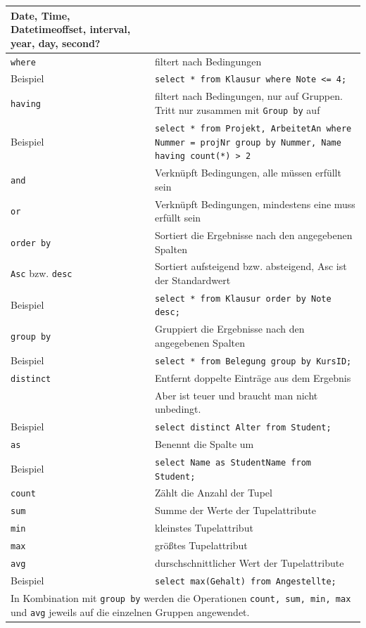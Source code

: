 \documentclass{article}
\begin{document}
\begin{center}
\begin{longtable}{|p{4cm}|p{7cm}|}
    \hline
    Date, Time, Datetimeoffset, interval, year, day, second? & \\
    \hline
    \texttt{where} & filtert nach Bedingungen \\
    \hline
    Beispiel & \texttt{select * from Klausur where Note <= 4;} \\
    \hline
    \texttt{having} & filtert nach Bedingungen, nur auf Gruppen. Tritt nur zusammen mit \texttt{Group by} auf \\
    \hline
    Beispiel & \texttt{select * from Projekt, ArbeitetAn where Nummer = projNr group by Nummer, Name having count(*) > 2} \\
    \hline
    \texttt{and} & Verknüpft Bedingungen, alle müssen erfüllt sein \\
    \hline
    \texttt{or} & Verknüpft Bedingungen, mindestens eine muss erfüllt sein \\
    \hline
    \texttt{order by} & Sortiert die Ergebnisse nach den angegebenen Spalten \\
    \hline
    \texttt{Asc} bzw. \texttt{desc} & Sortiert aufsteigend bzw. absteigend, Asc ist der Standardwert \\
    \hline
    Beispiel & \texttt{select * from Klausur order by Note desc;} \\
    \hline
    \texttt{group by} & Gruppiert die Ergebnisse nach den angegebenen Spalten \\
    \hline
    Beispiel & \texttt{select * from Belegung group by KursID;} \\
    \hline
    \texttt{distinct} & Entfernt doppelte Einträge aus dem Ergebnis \\
    & Aber ist teuer und braucht man nicht unbedingt.\\
    \hline
    Beispiel & \texttt{select distinct Alter from Student;} \\
    \hline
    \texttt{as} & Benennt die Spalte um \\
    Beispiel & \texttt{select Name as StudentName from Student;} \\
    \hline
    \texttt{count} & Zählt die Anzahl der Tupel \\
    \hline
    \texttt{sum} & Summe der Werte der Tupelattribute \\
    \hline
    \texttt{min} & kleinstes Tupelattribut \\
    \hline
    \texttt{max} & größtes Tupelattribut \\
    \hline
    \texttt{avg} & durschschnittlicher Wert der Tupelattribute \\
    \hline
    Beispiel & \texttt{select max(Gehalt) from Angestellte;} \\
    \hline
    \multicolumn{2}{|p{11cm}|}{In Kombination mit \texttt{group by} werden die Operationen \texttt{count, sum, min, max} und \texttt{avg} jeweils auf die einzelnen Gruppen angewendet.} \\
    \hline
  \end{longtable}
\end{center}
\end{document}
